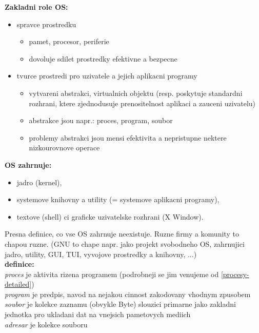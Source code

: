 \documentclass[a4paper, 11pt]{article}
\begin{document}
\noindent\textbf{Zakladni role OS:}
\begin{itemize}
    \item spravce prostredku
        \begin{itemize}
            \item pamet, procesor, periferie
             \item dovoluje sdilet prostredky efektivne a bezpecne
        \end{itemize}
    \item tvurce prostredi pro uzivatele a jejich aplikacni programy
        \begin{itemize}
            \item vytvareni abstrakci, virtualnich objektu (resp. poskytuje standardni rozhrani, ktere zjednodusuje prenositelnost aplikaci a zauceni uzivatelu)
            \item abstrakce jsou napr.: proces, program, soubor
            \item problemy abstrakci jsou mensi efektivita a nepristupne nektere nizkourovnove operace \\
        \end{itemize}
\end{itemize}

\noindent\textbf{OS zahrnuje:}
\begin{itemize}
    \item jadro (kernel),
    \item systemove knihovny a utility (= systemove aplikacni programy),
    \item textove (shell) ci graficke uzivatelske rozhrani (X Window). \\
\end{itemize}

\noindent Presna definice, co vse OS zahrnuje neexistuje. Ruzne firmy a komunity to chapou ruzne. (GNU to chape napr. jako projekt svobodneho OS, zahrnujici jadro, utility, GUI, TUI, vyvojove prostredky a knihovny, ...) \\[1em]

\noindent\textbf{definice:} \\[0.5em] \label{procesy} \label{soubory}
\textit{proces} je aktivita rizena programem (podrobneji se jim venujeme od \ref{procesy-detailed}) \\[0.2em]
\textit{program} je predpis, navod na nejakou cinnost zakodovany vhodnym zpusobem \\[0.2em]
\textit{soubor} je kolekce zaznamu (obvykle Byte) slouzici primarne jako zakladni jednotka pro ukladani dat na vnejsich pametovych mediich \\[0.2em]
\textit{adresar} je kolekce souboru
\end{document}

